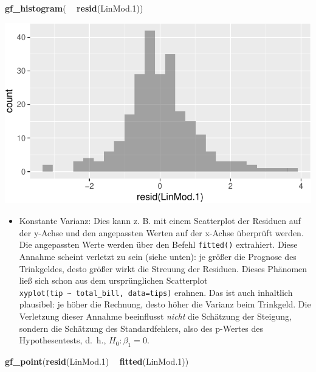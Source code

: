 \documentclass[12pt,ngerman,paper=a4,pagesize,DIV=13]{scrreprt}
\newenvironment{Shaded}{\begin{snugshade}}{\end{snugshade}}
\newcommand{\FloatTok}[1]{\textcolor[rgb]{0.00,0.00,0.81}{#1}}
\newcommand{\KeywordTok}[1]{\textcolor[rgb]{0.13,0.29,0.53}{\textbf{#1}}}
\newcommand{\NormalTok}[1]{#1}
\newcommand{\OperatorTok}[1]{\textcolor[rgb]{0.81,0.36,0.00}{\textbf{#1}}}
\newcommand{\StringTok}[1]{\textcolor[rgb]{0.31,0.60,0.02}{#1}}
\providecommand{\tightlist}{%
  \setlength{\itemsep}{0pt}\setlength{\parskip}{0pt}}
\begin{document}
\begin{Shaded}
\begin{Highlighting}[]
\KeywordTok{gf_histogram}\NormalTok{( }\OperatorTok{~}\StringTok{ }\KeywordTok{resid}\NormalTok{(LinMod}\FloatTok{.1}\NormalTok{))}
\end{Highlighting}
\end{Shaded}

\includegraphics{DatenerhebungStatistik-Uebung_files/figure-latex/unnamed-chunk-165-1.pdf}

\begin{itemize}
\tightlist
\item
  Konstante Varianz: Dies kann z. B. mit einem Scatterplot der Residuen
  auf der y-Achse und den angepassten Werten auf der x-Achse überprüft
  werden. Die angepassten Werte werden über den Befehl \texttt{fitted()}
  extrahiert. Diese Annahme scheint verletzt zu sein (siehe unten): je
  größer die Prognose des Trinkgeldes, desto größer wirkt die Streuung
  der Residuen. Dieses Phänomen ließ sich schon aus dem ursprünglichen
  Scatterplot
  \texttt{xyplot(tip\ \textasciitilde{}\ total\_bill,\ data=tips)}
  erahnen. Das ist auch inhaltlich plausibel: je höher die Rechnung,
  desto höher die Varianz beim Trinkgeld. Die Verletzung dieser Annahme
  beeinflusst \emph{nicht} die Schätzung der Steigung, sondern die
  Schätzung des Standardfehlers, also des p-Wertes des Hypothesentests,
  d.~h., \(H_0:\beta_1=0\).
\end{itemize}

\begin{Shaded}
\begin{Highlighting}[]
\KeywordTok{gf_point}\NormalTok{(}\KeywordTok{resid}\NormalTok{(LinMod}\FloatTok{.1}\NormalTok{) }\OperatorTok{~}\StringTok{ }\KeywordTok{fitted}\NormalTok{(LinMod}\FloatTok{.1}\NormalTok{))}
\end{Highlighting}
\end{Shaded}
\end{document}
